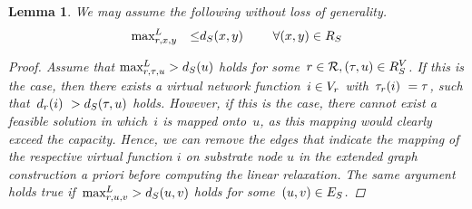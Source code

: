 \documentclass[10pt, conference, letterpaper]{IEEEtran}
\newtheorem{lemma}[theorem]{Lemma}
\begin{document}
\begin{lemma}
\label{lem:assumptions}
We may assume the following without loss of generality.
\begin{alignat}{3}
\maxLoadV[\req][x][y] && \leq & \Scap(x,y)~& \quad \forall (x,y) \in  \SR
\end{alignat}
\begin{proof}
Assume that $\maxLoadV > \Scap(u)$ holds for some~$r \in \mathcal{R}, (\tau,u) \in  R^V_{S}$. If this is the case, then there exists a virtual network function~$i \in V_{r}$ with~$\tau_{r}(i)~= \tau$, such that~$d_{r}(i)~> d_{S}(\tau,u)$ holds. However, if this is the case, there cannot exist a feasible solution in which~$i$ is mapped onto~$u$, as this mapping would clearly exceed the capacity. Hence, we can remove the edges that indicate the mapping of the respective virtual function $i$ on substrate node $u$ in the extended graph construction a priori before computing the linear relaxation. The same argument holds true if~$\maxLoadE > \Scap(u,v)$ holds for some~$(u,v) \in  E_S$. 
\end{proof}

\end{lemma}
\end{document}
